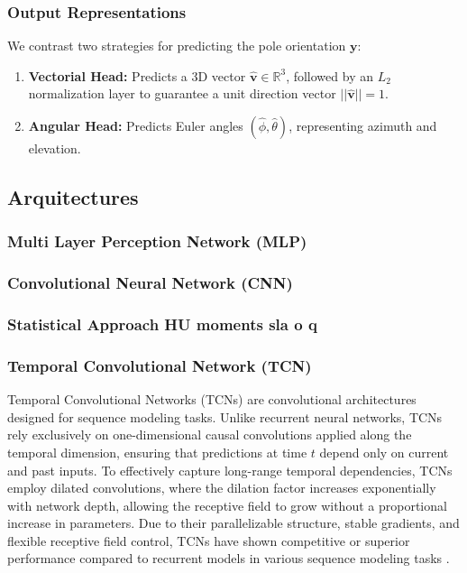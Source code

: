 \documentclass{article}
\begin{document}
\subsubsection{Output Representations}
We contrast two strategies for predicting the pole orientation $\mathbf{y}$:
\begin{enumerate}
    \item \textbf{Vectorial Head:} Predicts a 3D vector $\hat{\mathbf{v}} \in \mathbb{R}^3$, followed by an $L_2$ normalization layer to guarantee a unit direction vector $||\hat{\mathbf{v}}|| = 1$.
    \item \textbf{Angular Head:} Predicts Euler angles $(\hat{\phi}, \hat{\theta})$, representing azimuth and elevation.
\end{enumerate}

\subsection{Arquitectures}
\subsubsection{Multi Layer Perception Network (MLP)}
\subsubsection{Convolutional Neural Network (CNN)}
\subsubsection{Statistical Approach HU moments sla o q}
\subsubsection{Temporal Convolutional Network (TCN)}
Temporal Convolutional Networks (TCNs) are convolutional architectures
designed for sequence modeling tasks. Unlike recurrent neural networks, TCNs rely
exclusively on one-dimensional causal convolutions applied along the temporal dimension,
ensuring that predictions at time $t$ depend only on current and past inputs.
To effectively capture long-range temporal dependencies, TCNs employ dilated convolutions,
where the dilation factor increases exponentially with network depth, allowing the
receptive field to grow without a proportional increase in parameters.
Due to their parallelizable structure, stable gradients, and
flexible receptive field control, TCNs have shown competitive or superior performance
compared to recurrent models in various sequence modeling tasks \cite{bai2018empirical}.
\end{document}
